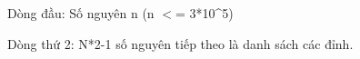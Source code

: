 Dòng đầu: Số nguyên n (n $<$= 3*10\textasciicircum5)

Dòng thứ 2: N*2-1 số nguyên tiếp theo là danh sách các đỉnh.
